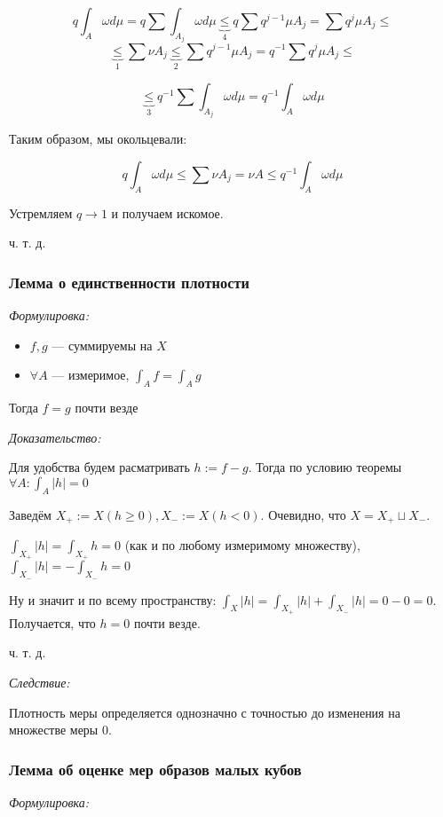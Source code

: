\documentclass{article}
\begin{document}
\[q\int_{A} \omega d\mu = q\sum \int_{A_j} \omega d\mu \underbrace{\le}_{4} q \sum q^{j - 1} \mu A_j = \sum q^j \mu A_j \le\]
\[\underbrace{\le}_{1} \sum \nu A_j \underbrace{\le}_{2} \sum q^{j - 1} \mu A_j = q^{-1} \sum q^j \mu A_j \le \]

\[\underbrace{\le}_{3} q^{-1} \sum \int_{A_j} \omega d\mu = q^{-1} \int_{A} \omega d \mu\]

Таким образом, мы окольцевали:

\[q\int_{A} \omega d\mu \le \sum \nu A_j = \nu A \le q^{-1} \int_{A} \omega d \mu\]

Устремляем $q \rightarrow 1$ и получаем искомое.

ч. т. д. 

\subsubsection{Лемма о единственности плотности}
\textit{Формулировка:}

\begin{itemize}
    \item $f, g$ --- суммируемы на $X$
    \item $\forall A$ --- измеримое, $\int_{A} f = \int_{A} g$
\end{itemize}

Тогда $f = g$ почти везде

\textit{Доказательство:}

Для удобства будем расматривать $h := f - g$. Тогда по условию теоремы $\forall A: \int_{A} |h| = 0$

Заведём $X_+ := X(h \ge 0), X_- := X(h < 0)$. Очевидно, что $X = X_+ \sqcup X_-$.

$\int_{X_+} |h| = \int_{X_+} h = 0$ (как и по любому измеримому множеству), $\int_{X_-} |h| = -\int_{X_-} h = 0$

Ну и значит и по всему пространству: $\int_{X} |h| = \int_{X_+} |h| + \int_{X_-} |h| = 0 - 0 = 0$. Получается, что $h = 0$ почти везде.

ч. т. д.



\textit{Следствие: }

Плотность меры определяется однозначно с точностью до изменения на множестве меры 0.

\subsubsection{Лемма об оценке мер образов малых кубов}
\textit{Формулировка:}
\end{document}
